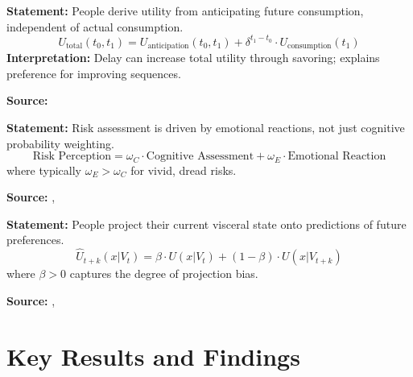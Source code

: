 \begin{tcolorbox}[colback=gray!5!white, colframe=gray!75!black,
    title=Axiom UNMAPPED_LO-4: Anticipatory Utility]
\textbf{Statement:} People derive utility from anticipating future consumption, independent of actual consumption.
\begin{equation}
U_{\text{total}}(t_0, t_1) = U_{\text{anticipation}}(t_0, t_1) + \delta^{t_1-t_0} \cdot U_{\text{consumption}}(t_1)
\end{equation}
\textbf{Interpretation:} Delay can increase total utility through savoring; explains preference for improving sequences.

\textbf{Source:} \citet{loewenstein1987emotions}
\end{tcolorbox}

\begin{tcolorbox}[colback=gray!5!white, colframe=gray!75!black,
    title=Axiom UNMAPPED_LO-5: Risk as Feelings]
\textbf{Statement:} Risk assessment is driven by emotional reactions, not just cognitive probability weighting.
\begin{equation}
\text{Risk Perception} = \omega_C \cdot \text{Cognitive Assessment} + \omega_E \cdot \text{Emotional Reaction}
\end{equation}
where typically $\omega_E > \omega_C$ for vivid, dread risks.

\textbf{Source:} \citet{loewenstein2000emotions}, \citet{loewenstein2001temptation}
\end{tcolorbox}

\begin{tcolorbox}[colback=gray!5!white, colframe=gray!75!black,
    title=Axiom UNMAPPED_LO-6: Projection Bias]
\textbf{Statement:} People project their current visceral state onto predictions of future preferences.
\begin{equation}
\hat{U}_{t+k}(x | V_t) = \beta \cdot U(x | V_t) + (1-\beta) \cdot U(x | V_{t+k})
\end{equation}
where $\beta > 0$ captures the degree of projection bias.

\textbf{Source:} \citet{loewenstein2000projecting}, \citet{loewenstein2003pain}
\end{tcolorbox}


\section{Key Results and Findings}
\label{sec:lo-results}

